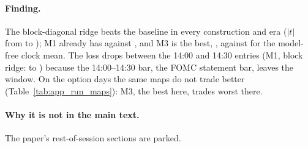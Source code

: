 \begin{table}[H]
\centering
\caption{QLIKE of the rest-of-day forecasts, pooled over the entry clocks
10:00--15:30 (the target runs to the 16:00 close), on all
\runappMhDays{} days and on the \runappMhPostDays{} days from 2016. DM $t$
compares the block-diagonal ridge with the HAR OLS baseline in the same
construction (negative: the ridge is better).}
\label{tab:app_run_multihorizon}
\runappfit{\small}
\end{table}

\paragraph{Finding.} The block-diagonal ridge beats the baseline in every
construction and era ($|t|$ from \runappMhDmLo{} to \runappMhDmHi{}); M1
already has \runappMhBOne{} against \runappMhAOne{}, and M3 is the best,
\runappMhBThree{}, against \runappMhNaive{} for the model-free clock mean. The
loss drops between the 14:00 and 14:30 entries (M1, block ridge:
\runappMhFourteen{} to \runappMhFourteenThirty{}) because the 14:00--14:30
bar, the FOMC statement bar, leaves the window. On the option days the same
maps do not trade better (Table~\ref{tab:app_run_maps}): M3, the best here,
trades worst there.

\paragraph{Why it is not in the main text.} The paper's rest-of-session
sections are parked.

